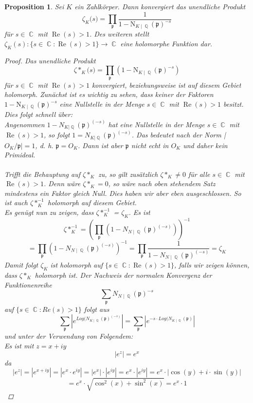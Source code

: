 \documentclass[10pt,a4paper]{article}
\theoremstyle{plain}
\newtheorem{prop}[thm]{Proposition}
\theoremstyle{definition}
\theoremstyle{remark}
\DeclareMathOperator{\C}{\mathbb{C}}
\DeclareMathOperator{\Q}{\mathbb{Q}}
\DeclareMathOperator{\re}{Re}
\begin{document}
\begin{prop}

Sei $\textit{K}$ ein Zahlkörper. Dann konvergiert das unendliche Produkt $$\zeta_{\textit{K}} \textit{(s)}= \prod_{\mathfrak{p}}\frac{1}{1-\mathrm{N}_{K \mid \Q}(\mathfrak{p})^{-s}}$$ für $s \in \C $ mit $ \re(s) > 1$. Des weiteren stellt $\zeta_{K}(s)\colon \{ s \in \C \colon \re(s)>1\} \rightarrow \C$ eine holomorphe Funktion dar.

\begin{proof}\label{proofprop14}
Das unendliche Produkt
$$\zeta*_{\textit{K}} \textit{(s)}= \prod_{\mathfrak{p}}(1-\mathrm{N}_{K \mid \Q}(\mathfrak{p})^{-s})$$ für $s \in \C $ mit $\re(s) > 1$ konvergiert, beziehungsweise ist auf diesem Gebiet holomorph.
Zunächst ist es wichtig zu sehen, dass keiner der Faktoren $1-\mathrm{N}_{K \mid \Q}(\mathfrak{p})^{-s}$ eine Nullstelle in der Menge $s \in \C $ mit $\re(s) > 1$ besitzt.
\\
Dies folgt schnell über: 
\\
Angenommen $1- N_{K|\Q}(\mathfrak{p})^{(-s)}$ hat eine Nullstelle in der Menge  $s \in \C $ mit $ \re(s) > 1$, so folgt $1 = N_{K|\Q}(\mathfrak{p})^{(-s)}$. Das bedeutet nach der Norm |$O_K /\mathfrak{p}| = 1$, d. h. $\mathfrak{p} = O_K$. Dann ist aber $\mathfrak{p}$ nicht echt in $O_K$ und daher kein Primideal. \\
\\
Trifft die Behauptung auf $\zeta*_{K}$ zu, so gilt zusätzlich $\zeta*_{K} \neq 0$ für alle  $s \in \C $ mit $ \re(s) > 1$. Denn wäre  $\zeta*_{K} = 0$, so wäre nach oben stehendem Satz mindestens ein Faktor gleich Null. Dies haben wir aber eben ausgeschlossen. So ist auch  $\zeta*_{K}^{-1}$ holomorph auf diesem Gebiet. \\Es genügt nun zu zeigen, dass 
$\zeta*_{K}^{-1}$ = $\zeta_{K}$. Es ist $$\zeta*_{K}^{-1}=(\prod_{\mathfrak{p}}(1 - N_{N\mid\Q}(\mathfrak{p})^{(-s)}))^{-1} $$ $$=\prod_{\mathfrak{p}}(1 - N_{N\mid\Q}(\mathfrak{p})^{(-s)})^{-1} = \prod_{\mathfrak{p}}\frac{1}{1 - N_{N\mid\Q}(\mathfrak{p})^{(-s)}}=\zeta_{K}$$
Damit folgt $\zeta_{K}$ ist holomorph auf $\{ s \in \C \colon \re(s) > 1\}$, falls wir zeigen können, dass $\zeta*_K$ holomorph ist. Der Nachweis der normalen Konvergenz der Funktionenreihe $$\sum_{\mathfrak{p}}N_{N\mid\Q}(\mathfrak{p})^{-s}$$ auf $\{ s \in \C \colon Re(s) > 1\}$ folgt aus $$\sum_{\mathfrak{p}}|e^{Log(N_{K\mid \Q}(\mathfrak{p})^{(-s)}}| = \sum_{\mathfrak{p}}|e^{-s\cdot Log(N_{K\mid \Q}(\mathfrak{p})}|$$
 und unter der Verwendung von Folgendem: \\Es ist mit $z = x + iy$ $$|e^z| = e^x $$ da $$|e^z|=|e^{x+iy}|=|e^{x}\cdot e^{iy}|= |e^{x}|\cdot |e^{iy}| = e^{x}\cdot |e^{iy}| = e^x \cdot |\cos(y)+i \cdot \sin(y)| $$ $$= e^x\cdot\sqrt{\cos^2(x)+\sin^2(x)} =e^x\cdot 1$$

\end{proof}
\end{prop}
\end{document}
